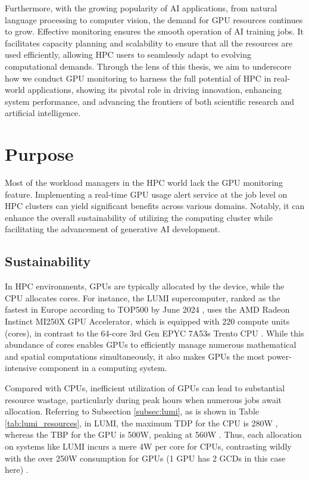 Furthermore, with the growing popularity of AI applications, from natural language processing to computer vision, the demand for GPU resources continues to grow. Effective monitoring ensures the smooth operation of AI training jobs. It facilitates capacity planning and scalability to ensure that all the resources are used efficiently, allowing HPC users to seamlessly adapt to evolving computational demands. Through the lens of this thesis, we aim to underscore how we conduct GPU monitoring to harness the full potential of HPC in real-world applications, showing its pivotal role in driving innovation, enhancing system performance, and advancing the frontiers of both scientific research and artificial intelligence.

\section{Purpose}
Most of the workload managers in the HPC world lack the GPU monitoring feature. Implementing a real-time GPU usage alert service at the job level on HPC clusters can yield significant benefits across various domains. Notably, it can enhance the overall sustainability of utilizing the computing cluster while facilitating the advancement of generative AI development.

\subsection{Sustainability}

In HPC environments, GPUs are typically allocated by the device, while the CPU allocates cores. For instance, the LUMI supercomputer, ranked as the fastest in Europe according to TOP500 by June 2024 \cite{TOP500}, uses the AMD Radeon Instinct MI250X GPU Accelerator, which is equipped with 220 compute units (cores), in contrast to the 64-core 3rd Gen EPYC 7A53s Trento CPU \cite{lumi}. While this abundance of cores enables GPUs to efficiently manage numerous mathematical and spatial computations simultaneously, it also makes GPUs the most power-intensive component in a computing system.

Compared with CPUs, inefficient utilization of GPUs can lead to substantial resource wastage, particularly during peak hours when numerous jobs await allocation. Referring to Subsection \ref{subsec:lumi}, as is shown in Table \ref{tab:lumi_resources}, in LUMI, the maximum TDP for the CPU is 280W \cite{amd-epyc-cpu}, whereas the TBP for the GPU is 500W, peaking at 560W \cite{amd-mi250x}. Thus, each allocation on systems like LUMI incurs a mere 4W per core for CPUs, contrasting wildly with the over 250W consumption for GPUs (1 GPU has 2 GCDs in this case here) \cite{lumi}.

